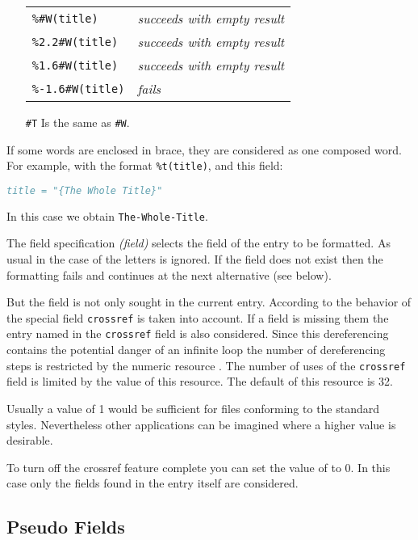 \documentclass[11pt,a4paper]{scrbook}
\begin{document}
\begin{itemize}
\begin{Example}
       \begin{tabular}{ll}
         \texttt{\%\#W(title)}		& \textit{succeeds with empty result}\\
         \texttt{\%2.2\#W(title)}	& \textit{succeeds with empty result}\\
         \texttt{\%1.6\#W(title)}	& \textit{succeeds with empty result}\\
         \texttt{\%-1.6\#W(title)}	& \textit{fails}
       \end{tabular}
     \end{Example}

   \item [\texttt{\#T}] Is the same as \texttt{\#W}.

\end{itemize}

If some words are enclosed in brace, they are considered as one composed word.
For example, with the format \verb|%t(title)|, and
this field:
\begin{lstlisting}[language=BibTeX]
  title = "{The Whole Title}"
\end{lstlisting}
In this case we obtain \verb|The-Whole-Title|.

The field specification \textit{(field)} selects the field of the entry to be
formatted. As usual in \BibTeX{} the case of the letters is ignored. If the
field does not exist then the formatting fails and continues at the next
alternative (see below).

But the field is not only sought in the current entry. According to the
behavior of \BibTeX{} the special field \texttt{crossref} is taken into
account. If a field is missing them the entry named in the \texttt{crossref}
field is also considered. Since this dereferencing contains the potential
danger of an infinite loop the number of dereferencing steps is restricted by
the numeric resource . The number of uses of the
\texttt{crossref} field is limited by the value of this resource. The default
of this resource is 32.

Usually a value of 1 would be sufficient for \BibTeX{} files conforming to the
standard styles. Nevertheless other applications can be imagined where a
higher value is desirable.

To turn off the crossref feature complete you can set the value of
 to 0. In this case only the fields found in the entry
itself are considered.


\subsection{Pseudo Fields}\label{sec:pseudo-fields}
\end{document}
